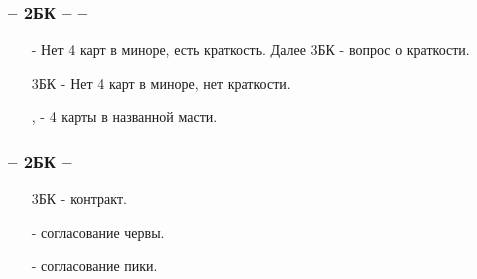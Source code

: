 \documentclass{article}
\begin{document}
\subsubsection{ -- 2БК --  -- }
\begin{enumerate}
    \item[\sp{3}] - Нет 4 карт в миноре, есть краткость. Далее 3БК - вопрос о краткости.
    \item[3БК] - Нет 4 карт в миноре, нет краткости.
    \item[\cl{4}, \di{4}] - 4 карты в названной масти.
\end{enumerate}
\subsubsection{ -- 2БК -- }
\begin{enumerate}
    \item[3БК] - контракт.
    \item[\cl{4}] - согласование червы.
    \item[\di{4}] - согласование пики.
\end{enumerate}
\end{document}
